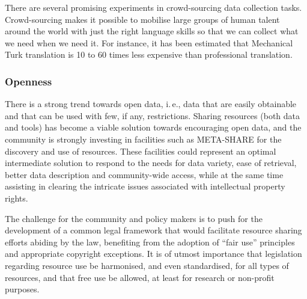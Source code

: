 \documentclass[10pt, plain]{../../metanetpaper}
\begin{document}
\begin{multicols}{2}
There are several promising experiments in crowd-sourcing data collection tasks. Crowd-sourcing makes it possible to mobilise large groups of human talent around the world with just the right language skills so that we can collect what we need when we need it. For instance, it has been estimated that Mechanical Turk translation is 10 to 60 times less expensive than professional translation. 


\subsubsection{Openness}
\label{sec:openness}

There is a strong trend towards open data, i.\,e., data that are easily obtainable and that can be used with few, if any, restrictions. Sharing resources (both data and tools) has become a viable solution towards encouraging open data, and the community is strongly investing in facilities such as META-SHARE for the discovery and use of resources. These facilities could represent an optimal intermediate solution to respond to the needs for data variety, ease of retrieval, better data description and community-wide access, while at the same time assisting in clearing the intricate issues associated with intellectual property rights.

The challenge for the community and policy makers is to push for the development of a common legal framework that would facilitate resource sharing efforts abiding by the law, benefiting from the adoption of “fair use” principles and appropriate copyright exceptions. It is of utmost importance that legislation regarding resource use be harmonised, and even standardised, for all types of resources, and that free use be allowed, at least for research or non-profit purposes. 



\end{multicols}
\end{document}
